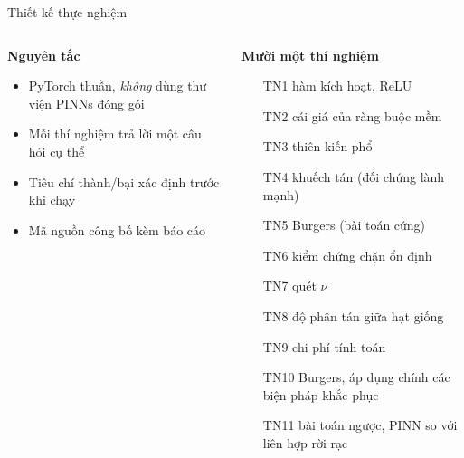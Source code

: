 \documentclass[aspectratio=169,11pt]{beamer}
\begin{document}
\begin{frame}{Thiết kế thực nghiệm}
\begin{columns}[T]
\begin{column}{0.5\textwidth}
\textbf{Nguyên tắc}
\begin{itemize}
\item PyTorch thuần, \emph{không} dùng thư viện PINNs đóng gói
\item Mỗi thí nghiệm trả lời một câu hỏi cụ thể
\item Tiêu chí thành/bại xác định \alert{trước} khi chạy
\item Mã nguồn công bố kèm báo cáo
\end{itemize}
\end{column}
\begin{column}{0.47\textwidth}
\textbf{Mười một thí nghiệm}
\begin{itemize}\scriptsize\setlength{\itemsep}{0pt}
\item[TN1] hàm kích hoạt, ReLU
\item[TN2] cái giá của ràng buộc mềm
\item[TN3] thiên kiến phổ
\item[TN4] khuếch tán (đối chứng lành mạnh)
\item[TN5] Burgers (bài toán cứng)
\item[TN6] kiểm chứng chặn ổn định
\item[TN7] quét $\nu$
\item[TN8] độ phân tán giữa hạt giống
\item[TN9] chi phí tính toán
\item[TN10] \alert{Burgers, áp dụng chính các biện pháp khắc phục}
\item[TN11] \alert{bài toán ngược, PINN so với liên hợp rời rạc}
\end{itemize}
\end{column}
\end{columns}
\end{frame}
\end{document}
